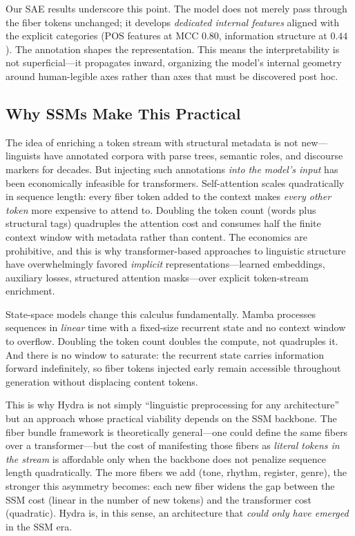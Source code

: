 \documentclass[11pt]{article}
\begin{document}
Our SAE results underscore this point. The model does not merely pass 
through the fiber tokens unchanged; it develops \emph{dedicated internal 
features} aligned with the explicit categories (POS features at MCC 
$0.80$, information structure at $0.44$). The annotation shapes the 
representation. This means the interpretability is not superficial---it 
propagates inward, organizing the model's internal geometry around 
human-legible axes rather than axes that must be discovered post hoc.

\subsection{Why SSMs Make This Practical}

The idea of enriching a token stream with structural metadata is not 
new---linguists have annotated corpora with parse trees, semantic roles, 
and discourse markers for decades. But injecting such annotations 
\emph{into the model's input} has been economically infeasible for 
transformers. Self-attention scales quadratically in sequence length: 
every fiber token added to the context makes \emph{every other token} 
more expensive to attend to. Doubling the token count (words plus 
structural tags) quadruples the attention cost and consumes half the 
finite context window with metadata rather than content. The economics 
are prohibitive, and this is why transformer-based approaches to 
linguistic structure have overwhelmingly favored \emph{implicit} 
representations---learned embeddings, auxiliary losses, structured 
attention masks---over explicit token-stream enrichment.

State-space models change this calculus fundamentally. Mamba processes 
sequences in \emph{linear} time with a fixed-size recurrent state and 
no context window to overflow. Doubling the token count doubles the 
compute, not quadruples it. And there is no window to saturate: the 
recurrent state carries information forward indefinitely, so fiber 
tokens injected early remain accessible throughout generation without 
displacing content tokens.

This is why Hydra is not simply ``linguistic preprocessing for any 
architecture'' but an approach whose practical viability depends on the 
SSM backbone. The fiber bundle framework is theoretically general---one 
could define the same fibers over a transformer---but the cost of 
manifesting those fibers as \emph{literal tokens in the stream} is 
affordable only when the backbone does not penalize sequence length 
quadratically. The more fibers we add (tone, rhythm, register, genre), 
the stronger this asymmetry becomes: each new fiber widens the gap 
between the SSM cost (linear in the number of new tokens) and the 
transformer cost (quadratic). Hydra is, in this sense, an architecture 
that \emph{could only have emerged} in the SSM era.
\end{document}
